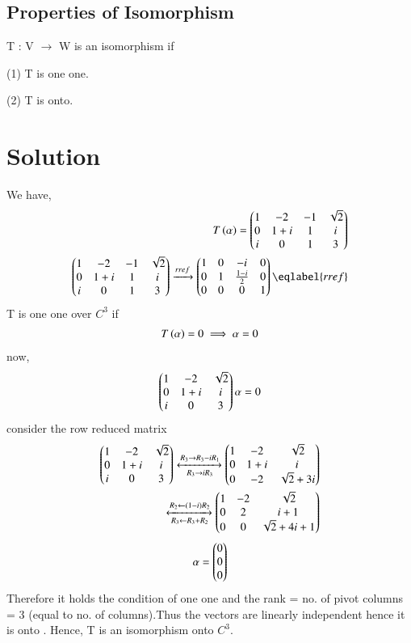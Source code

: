\documentclass[journal,12pt,twocolumn]{IEEEtran}
\begin{document}
\subsection{Properties of Isomorphism}
T : V $\rightarrow$ W is an isomorphism if
 
 (1) T is one one.
 
 (2) T is onto.
\section{Solution}
We have,
\begin{align}
    T\brak{\alpha}=\myvec{1&-2&-1&\sqrt{2}\\0&1+i&1&i\\i&0&1&3}&\\
\myvec{1&-2&-1&\sqrt{2}\\0&1+i&1&i\\i&0&1&3}\xrightarrow[]{rref}\myvec{1&0&-i&0\\0&1&\frac{1-i}{2}&0\\0&0&0&1}\eqlabel{rref}
\end{align}
T is one one over $C^{3}$ if 
\begin{align}
    T\left(\alpha\right)=0 \implies \alpha =0
\end{align}
now,
\begin{align}
 \begin{pmatrix}1&-2&\sqrt{2}\\0&1+i&i\\i&0&3\end{pmatrix}\alpha = 0
\end{align}
consider the row reduced matrix
\begin{align}
    \begin{pmatrix}1&-2&\sqrt{2}\\0&1+i&i\\i&0&3\end{pmatrix}
    \xleftrightarrow[R_3\rightarrow i R_3]{R_3\rightarrow R_3-iR_1}\begin{pmatrix}1&-2&\sqrt{2}\\0&1+i&i\\0&-2&\sqrt{2}+3i\end{pmatrix}\\
    \xleftrightarrow[R_3\leftarrow R_3+R_2]{R_2\leftarrow (1-i)R_2}\begin{pmatrix}1&-2&\sqrt{2}\\0&2&i+1\\0&0&\sqrt{2}+4i+1\end{pmatrix}
\end{align}
\begin{align}
    \mathbf{\alpha} = \begin{pmatrix}0\\0\\0\end{pmatrix}
\end{align}
Therefore it holds the condition of one one and the rank = no. of pivot columns = 3 (equal to no. of columns).Thus the  vectors are linearly independent hence it is onto . Hence, T is an isomorphism onto $C^{3}$. \newline
\end{document}
